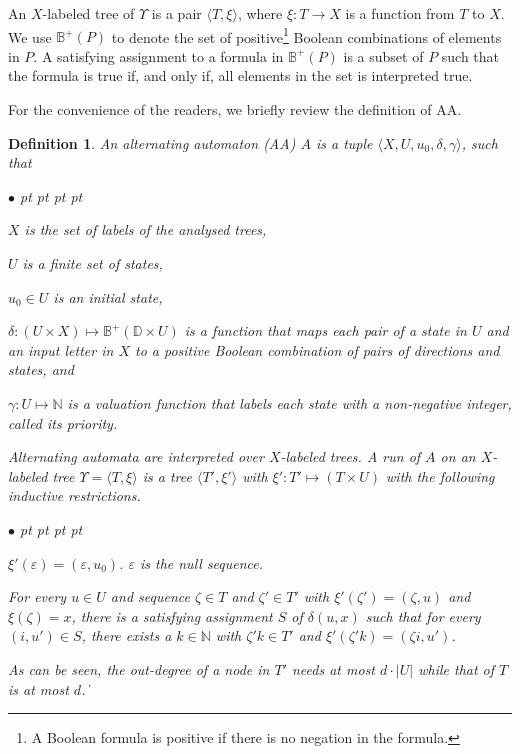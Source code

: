 \documentclass[11pt]{article}
\newtheorem{definition}{Definition}
\newcommand{\bbbbb}{{\mathbb B}}
\newcommand{\bbbbd}{{\mathbb D}}
\newcommand{\nnneg}{{\mathbb N}}
\def\qed{\ifmmode\|\else{\unskip\nobreak\hfil
\penalty50\hskip1em\null\nobreak\hfil$\blacksquare$
\parfillskip=0pt\finalhyphendemerits=0\endgraf}\fi}
\newenvironment{list1}{\begin{list}{$\bullet$}
{\topsep 0 pt \parsep 0 pt \partopsep 0 pt \itemsep 0 pt}}{\end{list}}
\begin{document}
An $X$-labeled tree of $\Upsilon$ is a pair $\langle T,\xi\rangle$, 
where $\xi:T\rightarrow X$ is a function from $T$ to $X$.  
We use $\bbbbb^+(P)$ to denote the 
set of positive\footnote{A Boolean formula is positive if there is 
no negation in the formula.} 
Boolean combinations of elements in $P$.  
A satisfying assignment to a formula in $\bbbbb^+(P)$ is 
a subset of $P$ such that 
the formula is true if, and only if, 
all elements in the set is interpreted true.  

For the convenience of the readers, we briefly review the 
definition of AA.  

\begin{definition}  
An alternating automaton ({\em AA}) 
$A$ is a tuple $\langle X,U,u_0,\delta,\gamma\rangle$, such that
\begin{list1} 
\item $X$ is the set of labels of the analysed trees,
\item $U$ is a finite set of states,
\item $u_0\in U$ is an initial state, 
\item $\delta:(U\times X)\mapsto \bbbbb^+(\bbbbd\times U)$ 
  is a function that maps each pair of a state in $U$ 
  and an input letter in $X$ to 
  a positive Boolean combination of pairs of directions and states, and
\item $\gamma:U\mapsto \nnneg$ is a valuation function that 
  labels each state with a non-negative integer, called its {\em priority}.  
\end{list1} 
Alternating automata are interpreted over $X$-labeled trees.
A \emph{run} of $A$ 
on an $X$-labeled tree $\Upsilon=\langle T,\xi\rangle$ is a tree 
$\langle T',\xi' \rangle$ 
with $\xi':T' \mapsto (T\times U)$ with the following 
inductive restrictions. 
\begin{list1}
\item $\xi'(\varepsilon)=(\varepsilon,u_0)$.  
  $\varepsilon$ is the null sequence. 
\item For every $u\in U$ and sequence $\zeta\in T$ and $\zeta'\in T'$ 
  with $\xi'(\zeta')=(\zeta,u)$ and $\xi(\zeta)=x$, 
  there is a satisfying assignment 
  $S$ of $\delta(u,x)$ such that 
  for every $(i,u')\in S$, there exists a $k\in\nnneg$ with 
  $\zeta'k\in T'$ and $\xi'(\zeta'k)=(\zeta i, u')$.  
\end{list1}
As can be seen, the out-degree of a node in $T'$ needs at most $d\cdot|U|$ 
while that of $T$ is at most $d$.  
\qed 
\end{definition} 
\end{document}
